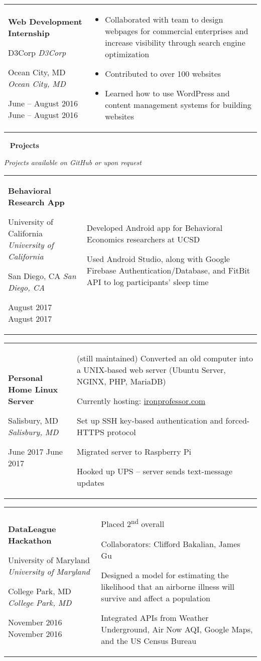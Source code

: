 \documentclass[11pt,letterpaper]{article}
\newcommand{\sect}[1]{
\begin{center}
	\noindent\xrfill[0.7ex]{0.5pt} \mbox{ } {\Large \bf #1} \mbox{ } \xrfill[0.7ex]{0.5pt}
\end{center}
}
\newcommand{\entry}[5]{
	\noindent
	\begin{tabular}{p{2in} p{\dimexpr \linewidth-2\tabcolsep-3in}} %
		\noindent \textbf{#1}
		
		\ifx #2  \else \noindent \textit{#2} \fi
		
		\ifx #3  \else \noindent \textit{#3} \fi
		
		\ifx #4  \else \noindent #4 \fi
		&
		#5
	\end{tabular}
	\vspace{0.5cm}
}
\begin{document}
	\entry{Web Development Internship}{D3Corp}{Ocean City, MD}{June -- August 2016}{
		\vspace{-5mm}
		\begin{itemize}[itemsep=0pt, wide]
			\item Collaborated with team to design webpages for commercial enterprises and increase visibility through search engine optimization
			\item Contributed to over 100 websites
			\item Learned how to use WordPress and content management systems for building websites
		\end{itemize}
	}
	
	\sect{Projects}

	\vspace*{-0.5cm}
	\begin{center}
		{\small \textit{Projects available on GitHub or upon request}}
	\end{center}
	
	\entry{Behavioral Research App}{University of California}{San Diego, CA}{August 2017}{
		Developed Android app for Behavioral Economics researchers at UCSD
		
		Used Android Studio, along with Google Firebase Authentication/Database, and FitBit API to log participants' sleep time
	}
	
	\entry{Personal Home Linux Server}{}{Salisbury, MD}{June 2017}{
		(still maintained) Converted an old computer into a UNIX-based web server (Ubuntu Server, NGINX, PHP, MariaDB)
		
		Currently hosting: \href{https://ironprofessor.com}{ironprofessor.com}
		
		Set up SSH key-based authentication and forced-HTTPS protocol
		
		Migrated server to Raspberry Pi
		
		Hooked up UPS -- server sends text-message updates
	}
	
	\entry{DataLeague Hackathon}{University of Maryland}{College Park, MD}{November 2016}{
		Placed 2\textsuperscript{nd} overall
		
		Collaborators: Clifford Bakalian, James Gu
		
		Designed a model for estimating the likelihood that an airborne illness will survive and affect a population
		
		Integrated APIs from Weather Underground, Air Now AQI, Google Maps, and the US Census Bureau
	}
	
\end{document}
